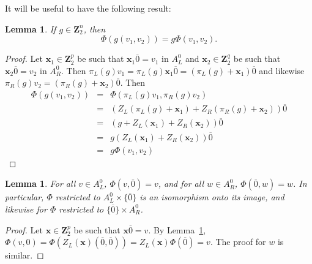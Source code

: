 \documentclass[12pt,twoside,singlespace]{article}
\numberwithin{equation}{section}
\newtheorem{lem}[equation]{Lemma}
\theoremstyle{definition}
\newcommand{\ZZ}{\mathbf{Z}}
\renewcommand{\vec}[1]{\mathbf{#1}}
\begin{document}
\begin{comment}
Suppose $i$ is a color and $(v_1,v_2)\in A_L^0\times A_R^0$ with $v_1=\vec{x}_1\overline{0}$ and $v_2=\vec{x}_2\overline{0}$.  Let $\vec{e}_i$ be the vector that has a single $1$ in the $i$th bit and $0$s elsewhere, so that for all vertices $v$, $\vec{e}_i v=q_i(v)$.  Using Lemma~\ref{lem:gphi}, we see that $\Phi(\vec{e}(v_1,v_2))=\vec{e}\Phi(v_1,v_2)$, so $\Phi$ sends edges of color $i$ to edges of color $i$.
\end{comment}

It will be useful to have the following result:
\begin{lem}
\label{lem:gphi}
If $g\in \ZZ_2^n$, then
\[\Phi(g(v_1,v_2))=g\Phi(v_1,v_2).\]
\end{lem}
\begin{proof}
Let $\vec{x}_1\in \ZZ_2^p$ be such that $\vec{x}_1\overline{0}=v_1$ in $A_L^0$ and $\vec{x}_2\in \ZZ_2^q$ be such that $\vec{x}_2\overline{0}=v_2$ in $A_R^0$.  Then $\pi_L(g)v_1 = \pi_L(g)\vec{x}_1\overline{0}=(\pi_L(g)+\vec{x}_1)\overline{0}$ and likewise $\pi_R(g)v_2=(\pi_R(g)+\vec{x}_2)\overline{0}$.  Then
\begin{eqnarray*}
\Phi(g(v_1,v_2))&=&\Phi(\pi_L(g)v_1,\pi_R(g)v_2)\\
&=&(Z_L(\pi_L(g)+\vec{x}_1)+Z_R(\pi_R(g)+\vec{x}_2))\overline{0}\\
&=&(g+Z_L(\vec{x}_1)+Z_R(\vec{x}_2))\overline{0}\\
&=&g(Z_L(\vec{x}_1)+Z_R(\vec{x}_2))\overline{0}\\
&=&g\Phi(v_1,v_2)
\end{eqnarray*}
\end{proof}

\begin{lem}
\label{lem:phisides}
For all $v\in A_L^0$, $\Phi(v,\overline{0})=v$, and for all $w\in A_R^0$, $\Phi(\overline{0},w)=w$.  In particular, $\Phi$ restricted to $A_L^0\times\{\overline{0}\}$ is an isomorphism onto its image, and likewise for $\Phi$ restricted to $\{\overline{0}\}\times A_R^0$.
\end{lem}
\begin{proof}
Let $\vec{x}\in \ZZ_2^p$ be such that $\vec{x}\overline{0}=v$.  By Lemma~\ref{lem:gphi}, $\Phi(v,0) = \Phi(Z_L(\vec{x})(\overline{0},\overline{0})) = Z_L(\vec{x})\Phi(\overline{0})=v$.  The proof for $w$ is similar.
\end{proof}
\end{document}
